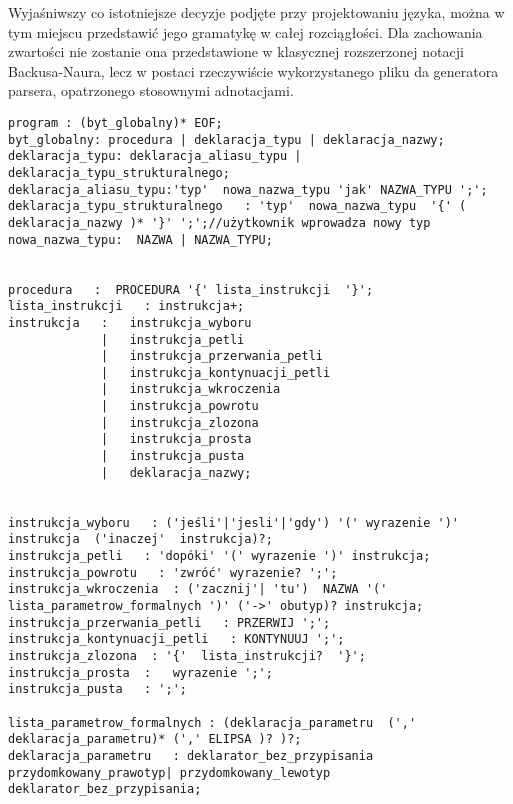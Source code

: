 Wyjaśniwszy co istotniejsze decyzje podjęte przy projektowaniu języka, można w tym miejscu przedstawić jego gramatykę w całej rozciągłości.
Dla zachowania zwartości nie zostanie ona przedstawione w klasycznej rozszerzonej notacji Backusa-Naura, lecz w postaci rzeczywiście wykorzystanego pliku da generatora parsera, opatrzonego stosownymi adnotacjami.
\lstset{
    escapechar=@,
    breaklines=true
}
\begin{lstlisting}[basicstyle=\scriptsize\ttfamily,breaklines=true]
program : (byt_globalny)* EOF;
byt_globalny: procedura | deklaracja_typu | deklaracja_nazwy;
deklaracja_typu: deklaracja_aliasu_typu | deklaracja_typu_strukturalnego;
deklaracja_aliasu_typu:'typ'  nowa_nazwa_typu 'jak' NAZWA_TYPU ';';
deklaracja_typu_strukturalnego   : 'typ'  nowa_nazwa_typu  '{' ( deklaracja_nazwy )* '}' ';';//użytkownik wprowadza nowy typ
nowa_nazwa_typu:  NAZWA | NAZWA_TYPU;


procedura   :  PROCEDURA '{' lista_instrukcji  '}';
lista_instrukcji   : instrukcja+;
instrukcja   :   instrukcja_wyboru
             |   instrukcja_petli
             |   instrukcja_przerwania_petli
             |   instrukcja_kontynuacji_petli
             |   instrukcja_wkroczenia
             |   instrukcja_powrotu
             |   instrukcja_zlozona
             |   instrukcja_prosta
             |   instrukcja_pusta
             |   deklaracja_nazwy;


instrukcja_wyboru   : ('jeśli'|'jesli'|'gdy') '(' wyrazenie ')' instrukcja  ('inaczej'  instrukcja)?;
instrukcja_petli   : 'dopóki' '(' wyrazenie ')' instrukcja;
instrukcja_powrotu   : 'zwróć' wyrazenie? ';';
instrukcja_wkroczenia  : ('zacznij'| 'tu')  NAZWA '(' lista_parametrow_formalnych ')' ('->' obutyp)? instrukcja;
instrukcja_przerwania_petli   : PRZERWIJ ';';
instrukcja_kontynuacji_petli   : KONTYNUUJ ';';
instrukcja_zlozona  : '{'  lista_instrukcji?  '}';
instrukcja_prosta  :   wyrazenie ';';
instrukcja_pusta   : ';';

lista_parametrow_formalnych : (deklaracja_parametru  (',' deklaracja_parametru)* (',' ELIPSA )? )?;
deklaracja_parametru   : deklarator_bez_przypisania przydomkowany_prawotyp| przydomkowany_lewotyp  deklarator_bez_przypisania;



\end{lstlisting}
